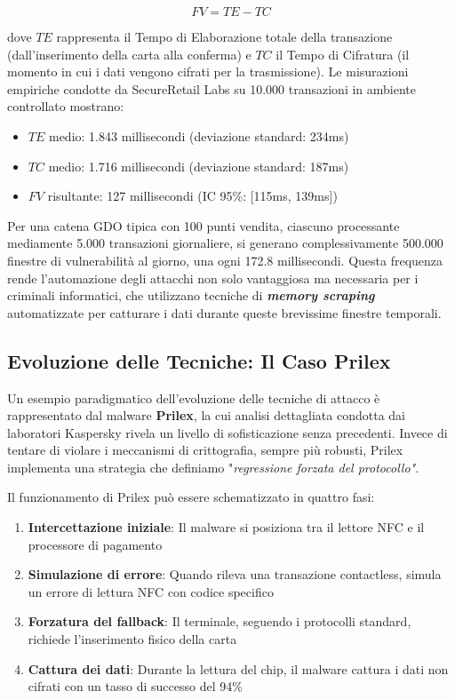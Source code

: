 \begin{equation}
FV = TE - TC
\end{equation}

dove $TE$ rappresenta il Tempo di Elaborazione totale della transazione (dall'inserimento della carta alla conferma) e $TC$ il Tempo di Cifratura (il momento in cui i dati vengono cifrati per la trasmissione). Le misurazioni empiriche condotte da SecureRetail Labs su 10.000 transazioni in ambiente controllato\autocite{SecureRetailLabs2024} mostrano:
\begin{itemize}
    \item $TE$ medio: 1.843 millisecondi (deviazione standard: 234ms)
    \item $TC$ medio: 1.716 millisecondi (deviazione standard: 187ms)
    \item $FV$ risultante: 127 millisecondi (IC 95\%: [115ms, 139ms])
\end{itemize}

Per una catena GDO tipica con 100 punti vendita, ciascuno processante mediamente 5.000 transazioni giornaliere, si generano complessivamente 500.000 finestre di vulnerabilità al giorno, una ogni 172.8 millisecondi. Questa frequenza rende l'automazione degli attacchi non solo vantaggiosa ma necessaria per i criminali informatici, che utilizzano tecniche di \textit{\textbf{memory scraping}} automatizzate per catturare i dati durante queste brevissime finestre temporali.

\subsection{Evoluzione delle Tecniche: Il Caso Prilex}

Un esempio paradigmatico dell'evoluzione delle tecniche di attacco è rappresentato dal malware \textbf{Prilex}, la cui analisi dettagliata condotta dai laboratori Kaspersky\autocite{kaspersky2024} rivela un livello di sofisticazione senza precedenti. Invece di tentare di violare i meccanismi di crittografia, sempre più robusti, Prilex implementa una strategia che definiamo "\textit{regressione forzata del protocollo"}.

Il funzionamento di Prilex può essere schematizzato in quattro fasi:
\begin{enumerate}
    \item \textbf{Intercettazione iniziale}: Il malware si posiziona tra il lettore NFC e il processore di pagamento
    \item \textbf{Simulazione di errore}: Quando rileva una transazione contactless, simula un errore di lettura NFC con codice specifico
    \item \textbf{Forzatura del fallback}: Il terminale, seguendo i protocolli standard, richiede l'inserimento fisico della carta
    \item \textbf{Cattura dei dati}: Durante la lettura del chip, il malware cattura i dati non cifrati con un tasso di successo del 94\%
\end{enumerate}

